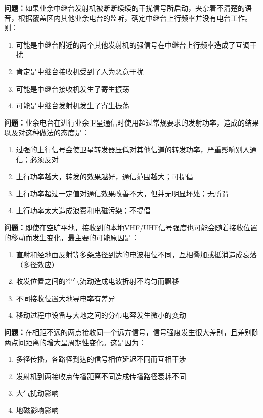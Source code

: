 \documentclass{ctexbook}%
\begin{document}
\textbf{问题：}如果业余中继台发射机被断断续续的干扰信号所启动，夹杂着不清楚的语音，根据覆盖区内其他业余电台的监听，确定中继台上行频率并没有电台工作。则：
\begin{enumerate}[label=\Alph*), leftmargin=3em]
\item 可能是中继台附近的两个其他发射机的强信号在中继台上行频率造成了互调干扰
\item 肯定是中继台接收机受到了人为恶意干扰
\item 可能是中继台接收机发生了寄生振荡
\item 可能是中继台发射机发生了寄生振荡
\end{enumerate}

\textbf{问题：}业余电台在进行业余卫星通信时使用超过常规要求的发射功率，造成的结果以及对这种做法的态度是：
\begin{enumerate}[label=\Alph*), leftmargin=3em]
\item 过强的上行信号会使卫星转发器压低对其他信道的转发功率，严重影响别人通信；必须反对
\item 上行功率越大，转发的效果越好，通信范围越大；可提倡
\item 上行功率超过一定值对通信效果改善不大，但并无明显坏处；无所谓
\item 上行功率太大造成浪费和电磁污染；不提倡
\end{enumerate}

\textbf{问题：}即使在空旷平地，接收到的本地VHF/UHF信号强度也可能会随着接收位置的移动而发生变化，最主要的可能原因是：
\begin{enumerate}[label=\Alph*), leftmargin=3em]
\item 直射和经地面反射等多条路径到达的电波相位不同，互相叠加或抵消造成衰落（多径效应）
\item 收发位置之间的空气流动造成电波折射不均匀而飘移
\item 不同接收位置大地导电率有差异
\item 移动过程中设备与大地之间的分布电容发生微小的变动
\end{enumerate}

\textbf{问题：}在相距不远的两点接收同一个远方信号，信号强度发生很大差别，且差别随两点间距离的增大呈周期性变化。这是因为：
\begin{enumerate}[label=\Alph*), leftmargin=3em]
\item 多径传播，各路径到达的信号相位延迟不同而互相干涉
\item 发射机到两接收点传播距离不同造成传播路径衰耗不同
\item 大气扰动影响
\item 地磁影响影响
\end{enumerate}
\end{document}
